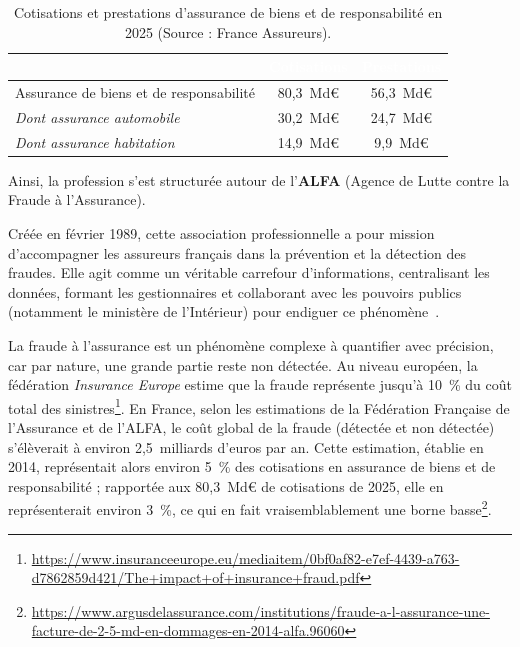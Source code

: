 \begin{table}[H]
    \centering
    \renewcommand{\arraystretch}{1.4}
    \begin{tabularx}{\textwidth}{|>{\raggedright\arraybackslash}X|c|c|}
        \hline
        \rowcolor{accenture}
        \textcolor{white}{} & \textcolor{white}{\textbf{Cotisations}} & \textcolor{white}{\textbf{Prestations}} \\
        \hline
        Assurance de biens et de responsabilité & 80,3~Md\euro{} & 56,3~Md\euro{} \\
        \hline
        \textit{Dont assurance automobile} & 30,2~Md\euro{} & 24,7~Md\euro{} \\
        \hline
        \textit{Dont assurance habitation} & 14,9~Md\euro{} & 9,9~Md\euro{} \\
        \hline
    \end{tabularx}
    \caption{Cotisations et prestations d'assurance de biens et de responsabilité en 2025 (Source : France Assureurs)\protect\footnotemark.}
    \label{tab:cotisations-prestations}
\end{table}

Ainsi, la profession s'est structurée autour de l'\textbf{ALFA} (Agence de Lutte contre la Fraude à l'Assurance).

Créée en février 1989, cette association professionnelle a pour mission d'accompagner les assureurs français dans la prévention et la détection des fraudes. Elle agit comme un véritable carrefour d'informations, centralisant les données, formant les gestionnaires et collaborant avec les pouvoirs publics (notamment le ministère de l'Intérieur) pour endiguer ce phénomène~\cite{alfa_site}.

La fraude à l'assurance est un phénomène complexe à quantifier avec précision, car par nature, une grande partie reste non détectée. Au niveau européen, la fédération \textit{Insurance Europe} estime que la fraude représente jusqu'à 10~\% du coût total des sinistres\footnote{\url{https://www.insuranceeurope.eu/mediaitem/0bf0af82-e7ef-4439-a763-d7862859d421/The+impact+of+insurance+fraud.pdf}}. En France, selon les estimations de la Fédération Française de l'Assurance et de l'ALFA, le coût global de la fraude (détectée et non détectée) s'élèverait à environ 2,5~milliards d'euros par an. Cette estimation, établie en 2014, représentait alors environ 5~\% des cotisations en assurance de biens et de responsabilité ; rapportée aux 80,3~Md\euro{} de cotisations de 2025, elle en représenterait environ 3~\%, ce qui en fait vraisemblablement une borne basse\footnote{\url{https://www.argusdelassurance.com/institutions/fraude-a-l-assurance-une-facture-de-2-5-md-en-dommages-en-2014-alfa.96060}}.

